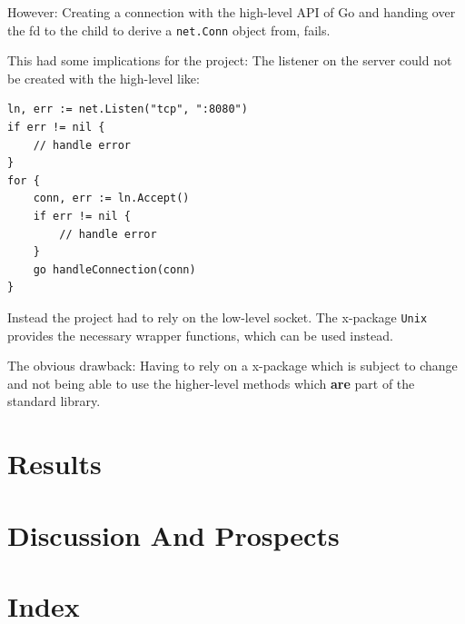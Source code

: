 \documentclass[10pt,a4paper,titlepage,twoside,english,final]{zhawreprt}
\begin{document}
However: Creating a connection with the high-level \gls{API} of \gls{Go} and handing over the \gls{fd} to the child to derive a \texttt{net.Conn} object from, fails.

This had some implications for the project: The listener on the server could not be created with the high-level like:
\setlistingGo
\begin{lstlisting}[caption={\gls{Go}'s high level \gls{API} for listener},label=lst:ListenForConn]
ln, err := net.Listen("tcp", ":8080")
if err != nil {
	// handle error
}
for {
	conn, err := ln.Accept()
	if err != nil {
		// handle error
	}
	go handleConnection(conn)
}
\end{lstlisting}

Instead the project had to rely on the low-level \gls{socket}.
The \gls{x-package} \texttt{Unix} provides the necessary wrapper functions, which can be used instead.

The obvious drawback: Having to rely on a \gls{x-package} which is subject to change and not being able to use the higher-level methods which \textbf{are} part of the standard library.


\chapter{Results}\label{chp:Results}

\chapter{Discussion And Prospects}\label{chp:DiscussionAndProspects}

\chapter{Index}\label{chp:Index}
\label{sec:Bibliography}
\newpage
\printglossary\label{sec:Glossary}
\newpage
\listoffigures\label{sec:ListOfFigures}
\newpage
\listoftables\label{sec:ListOfTables}
\newpage
\lstlistoflistings\label{sec:ListOfListings}
\newpage
\printglossary[title=SymbolGlossary,type=symbols]\label{sec:SymbolGlossary}
\newpage
\printglossary[title=Acronym Glossary,type=\acronymtype]\label{sec:AcronymGlossary}
\newpage
\printindex\label{sec:Index}
\end{document}

